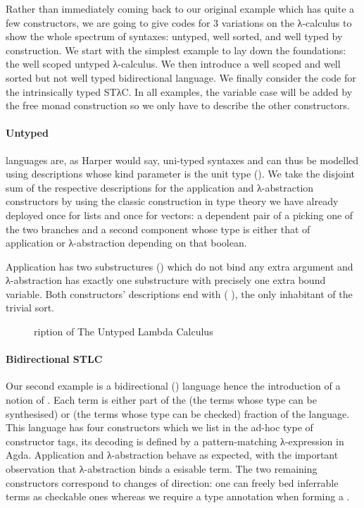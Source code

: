 Rather than immediately coming back to our original example which has quite
a few constructors, we are going to give codes for 3 variations on the
λ-calculus to show the whole spectrum of syntaxes: untyped, well sorted,
and well typed by construction.
%
We start with the simplest example to lay down the foundations: the well
scoped untyped λ-calculus.
%
We then introduce a well scoped and well sorted but not well typed
bidirectional language.
%
We finally consider the code for the intrinsically typed STλC.
%
In all examples, the variable case will be added by the free monad
construction so we only have to describe the other constructors.

\paragraph{Untyped} languages are, as Harper would say, uni-typed syntaxes and
can thus be modelled using descriptions whose kind parameter is the unit type
().
%
We take the disjoint sum of the respective descriptions for the application
and λ-abstraction constructors by using the classic construction in type
theory we have already deployed once for lists and once for vectors: a
dependent pair of a  picking one of the two branches and a second
component whose type is either that of application or λ-abstraction depending
on that boolean.

Application has two substructures () which do not bind any extra
argument and λ-abstraction has exactly one substructure with precisely
one extra bound variable. Both constructors' descriptions end with
( ), the only inhabitant of the trivial sort.

\begin{figure}[h]
\caption{ription of The Untyped Lambda Calculus
\label{fig:desculc}\label{fig:descUTLC}}
\end{figure}

\paragraph{Bidirectional STLC}\label{par:bidirectional} Our second example
is a bidirectional (\cite{pierce2000local}) language hence the introduction
of a notion of . Each term is either part of the  (the
terms whose type can be synthesised) or  (the terms whose type
can be checked) fraction of the language.
%
This language has four constructors
which we list in the ad-hoc  type of constructor tags, its
decoding  is defined by a pattern-matching λ-expression in Agda.
Application and λ-abstraction behave as expected, with the important
observation that λ-abstraction binds a esisable term. The two
remaining constructors correspond to changes of direction: one can freely
bed inferrable terms as checkable ones whereas we require a type
annotation when forming a .

